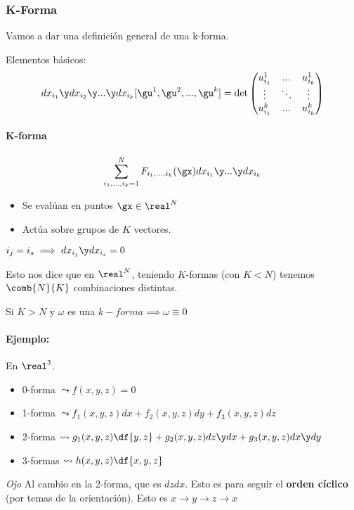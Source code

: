 \subsubsection{K-Forma}

Vamos a dar una definición general de una k-forma.

Elementos básicos:
\[dx_{i_1} \y dx_{i_2}\y...\y dx_{i_k}[\gu^1,\gu^2,...,\gu^k] = \det\begin{pmatrix}
u_{i_1}^1 & ... & u_{i_k}^1\\
\vdots & \ddots & \vdots\\
u_{i_1}^k & ... & u_{i_k}^k
\end{pmatrix}\]

\paragraph{K-forma}

\[
\sum_{i_1,...,i_k=1}^N F_{i_1,...,i_k}(\gx)dx_{i_1} \y ... \y dx_{i_k}
\]

\begin{itemize}
\item Se evalúan en puntos $\gx\in\real^N$
\item Actúa sobre grupos de $K$ vectores.
\end{itemize}

\obs $i_j = i_s \implies dx_{i_j}\y dx_{i_s} = 0$

Esto nos dice que en $\real^N$, teniendo $K$-formas (con $K<N$) tenemos $\comb{N}{K}$ combinaciones distintas.

\obs Si $K>N$ y $\omega$ es una $k-forma \implies \omega \equiv 0$


\paragraph{Ejemplo:} En $\real^3$.

\begin{itemize}
\item 0-forma $\leadsto f(x,y,z) = 0$
\item 1-forma $\leadsto f_1(x,y,z)dx + f_2(x,y,z)dy + f_3(x,y,z)dz$
\item 2-forma $\leadsto g_1(x,y,z)\df{y,z} + g_2(x,y,z)dz\y dx + g_3(x,y,z)dx\y dy$
\item 3-formas $\leadsto h(x,y,z)\df{x,y,z}$
\end{itemize}

\emph{Ojo} Al cambio en la 2-forma, que es $dzdx$. Esto es para seguir el \textbf{orden cíclico} (por temas de la orientación). Esto es $x\to y \to z \to x$


